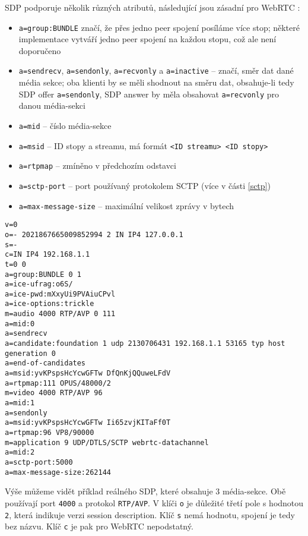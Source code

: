 SDP podporuje několik různých atributů, následující jsou zásadní pro WebRTC
\cite{WebRTCForTheCurious,IETF-RFC8866,IETF-RFC5888,IETF-RFC8841}:
\begin{itemize}
	\item \texttt{a=group:BUNDLE} značí, že přes jedno peer spojení
	      posíláme více stop; některé implementace vytváří jedno peer spojení na
	      každou stopu, což ale není doporučeno
	\item \texttt{a=sendrecv}, \texttt{a=sendonly},
	      \texttt{a=recvonly} a \texttt{a=inactive} --
	      značí, směr dat dané média sekce; oba klienti by se měli shodnout na
	      směru dat, obsahuje-li tedy SDP offer \texttt{a=sendonly},
	      SDP answer by měla obsahovat \texttt{a=recvonly} pro danou
	      média-sekci
	\item \texttt{a=mid} -- číslo média-sekce
	\item \texttt{a=msid} -- ID stopy a streamu, má formát
	      \texttt{<ID streamu> <ID stopy>}
	\item \texttt{a=rtpmap} -- zmíněno v předchozím odstavci
	\item \texttt{a=sctp-port} -- port používaný protokolem SCTP (více
	      v části \ref{sctp})
	\item \texttt{a=max-message-size} -- maximální velikost zprávy v
	      bytech
\end{itemize}

\begin{verbatim}
v=0
o=- 2021867665009852994 2 IN IP4 127.0.0.1
s=-
c=IN IP4 192.168.1.1
t=0 0
a=group:BUNDLE 0 1
a=ice-ufrag:o6S/
a=ice-pwd:mXxyUi9PVAiuCPvl
a=ice-options:trickle
m=audio 4000 RTP/AVP 0 111
a=mid:0
a=sendrecv
a=candidate:foundation 1 udp 2130706431 192.168.1.1 53165 typ host generation 0
a=end-of-candidates
a=msid:yvKPspsHcYcwGFTw DfQnKjQQuweLFdV
a=rtpmap:111 OPUS/48000/2
m=video 4000 RTP/AVP 96
a=mid:1
a=sendonly
a=msid:yvKPspsHcYcwGFTw Ii65zvjKITaFf0T
a=rtpmap:96 VP8/90000
m=application 9 UDP/DTLS/SCTP webrtc-datachannel
a=mid:2
a=sctp-port:5000
a=max-message-size:262144
\end{verbatim}

Výše můžeme vidět příklad reálného SDP, které obsahuje 3 média-sekce. Obě
používají port \texttt{4000} a protokol \texttt{RTP/AVP}. V
klíči \texttt{o} je důležité třetí pole s hodnotou
\texttt{2}, která indikuje verzi session description. Klíč
\texttt{s} nemá hodnotu, spojení je tedy bez názvu. Klíč
\texttt{c} je pak pro WebRTC nepodstatný.

